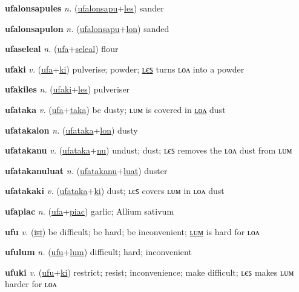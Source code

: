 \textbf{\hypertarget{ufalonsapules}{ufalonsapules}} \textit{n.} (\hyperlink{ufalonsapu}{ufalonsapu}+\allowbreak \hyperlink{les}{les})
sander

\textbf{\hypertarget{ufalonsapulon}{ufalonsapulon}} \textit{n.} (\hyperlink{ufalonsapu}{ufalonsapu}+\allowbreak \hyperlink{lon}{lon})
sanded

\textbf{\hypertarget{ufaseleal}{ufaseleal}} \textit{n.} (\hyperlink{ufa}{ufa}+\allowbreak \hyperlink{seleal}{seleal})
flour

\textbf{\hypertarget{ufaki}{ufaki}} \textit{v.} (\hyperlink{ufa}{ufa}+\allowbreak \hyperlink{ki}{ki})
pulverise; powder; \hyperlink{ufakiles}{ʟєꜱ} turns ʟᴏᴧ into a powder

\textbf{\hypertarget{ufakiles}{ufakiles}} \textit{n.} (\hyperlink{ufaki}{ufaki}+\allowbreak \hyperlink{les}{les})
pulveriser

\textbf{\hypertarget{ufataka}{ufataka}} \textit{v.} (\hyperlink{ufa}{ufa}+\allowbreak \hyperlink{taka}{taka})
be dusty; ʟᴜᴍ is covered in \hyperlink{ufatakalon}{ʟᴏᴧ} dust

\textbf{\hypertarget{ufatakalon}{ufatakalon}} \textit{n.} (\hyperlink{ufataka}{ufataka}+\allowbreak \hyperlink{lon}{lon})
dusty

\textbf{\hypertarget{ufatakanu}{ufatakanu}} \textit{v.} (\hyperlink{ufataka}{ufataka}+\allowbreak \hyperlink{nu}{nu})
undust; dust; ʟєꜱ removes the ʟᴏᴧ dust from ʟᴜᴍ

\textbf{\hypertarget{ufatakanuluat}{ufatakanuluat}} \textit{n.} (\hyperlink{ufatakanu}{ufatakanu}+\allowbreak \hyperlink{luat}{luat})
duster

\textbf{\hypertarget{ufatakaki}{ufatakaki}} \textit{v.} (\hyperlink{ufataka}{ufataka}+\allowbreak \hyperlink{ki}{ki})
dust; ʟєꜱ covers ʟᴜᴍ in ʟᴏᴧ dust

\textbf{\hypertarget{ufapiac}{ufapiac}} \textit{n.} (\hyperlink{ufa}{ufa}+\allowbreak \hyperlink{piac}{piac})
garlic; Allium sativum

\textbf{\hypertarget{ufu}{ufu}} \textit{v.} (\hyperlink{isi}{\sout{isi}})
be difficult; be hard; be inconvenient; \hyperlink{ufulum}{ʟᴜᴍ} is hard for ʟᴏᴧ

\textbf{\hypertarget{ufulum}{ufulum}} \textit{n.} (\hyperlink{ufu}{ufu}+\allowbreak \hyperlink{lum}{lum})
difficult; hard; inconvenient

\textbf{\hypertarget{ufuki}{ufuki}} \textit{v.} (\hyperlink{ufu}{ufu}+\allowbreak \hyperlink{ki}{ki})
restrict; resist; inconvenience; make difficult; ʟєꜱ makes ʟᴜᴍ harder for ʟᴏᴧ

